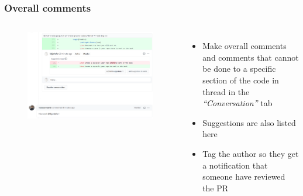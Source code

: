 \documentclass[aspectratio=169]{beamer} %
\begin{document}
\begin{frame}
	\frametitle{Overall comments}
	\begin{columns}[c]

		\vspace{-.75cm}
		\begin{figure}
			\centering
			\includegraphics[width=\textwidth]{./img/pr-comment.png}
		\end{figure}

		\begin{itemize}
			\setlength\itemsep{1em}
			\item Make overall comments and comments
			that cannot be done to a specific section of the code
			in thread in the \textit{``Conversation''} tab
			\item Suggestions are also listed here
			\item Tag the author so they get a notification
			that someone have reviewed the PR
		\end{itemize}

	\end{columns}
\end{frame}
\end{document}
